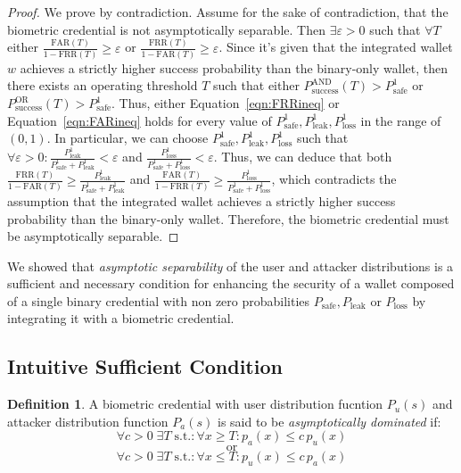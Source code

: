 \documentclass[sigconf]{acmart}
\theoremstyle{definition}
\newtheorem{definition}{Definition}
\begin{document}
\begin{proof}
    We prove by contradiction. Assume for the sake of contradiction, that the biometric credential is not asymptotically separable. Then $\exists \varepsilon > 0$ such that $\forall T$ either $\frac{\mathrm{FAR}(T)}{1-\mathrm{FRR}(T)} \ge \varepsilon$ or $\frac{\mathrm{FRR}(T)}{1-\mathrm{FAR}(T)} \ge \varepsilon$. Since it's given that the integrated wallet $w$ achieves a strictly higher success probability than the binary-only wallet, then there exists an operating threshold $T$ such that either $P^{\text{AND}}_{\text{success}}(T) > P^1_{\text{safe}}$ or $P^{\text{OR}}_{\text{success}}(T) > P^1_{\text{safe}}$. Thus, either Equation~\ref{eqn:FRRineq} or Equation~\ref{eqn:FARineq} holds for every value of $P^{1}_{\text{safe}}, P^{1}_{\text{leak}}, P^{1}_{\text{loss}}$ in the range of $(0,1)$. In particular, we can choose $P^{1}_{\text{safe}}, P^{1}_{\text{leak}}, P^{1}_{\text{loss}}$ such that $\forall \varepsilon > 0: \frac{P^{1}_{\text{leak}}}{P^{1}_{\text{safe}}+P^{1}_{\text{leak}}} < \varepsilon$ and $\frac{P^{1}_{\text{loss}}}{P^{1}_{\text{safe}}+P^{1}_{\text{loss}}} < \varepsilon$. Thus, we can deduce that both $\frac{\mathrm{FRR}(T)}{1-\mathrm{FAR}(T)} \ge \frac{P^{1}_{\text{leak}}}{P^{1}_{\text{safe}}+P^{1}_{\text{leak}}}$ and $\frac{\mathrm{FAR}(T)}{1-\mathrm{FRR}(T)} \ge \frac{P^{1}_{\text{loss}}}{P^{1}_{\text{safe}}+P^{1}_{\text{loss}}}$, which contradicts the assumption that the integrated wallet achieves a strictly higher success probability than the binary-only wallet. Therefore, the biometric credential must be asymptotically separable.

\end{proof}
We showed that \emph{asymptotic separability} of the user and attacker distributions is a sufficient and necessary condition for enhancing the security of a wallet composed of a single binary credential with non zero probabilities $P_\text{safe}, P_\text{leak} \text{ or } P_\text{loss}$ by integrating it with a biometric credential.

\subsection{Intuitive Sufficient Condition}\label{sec:6.3}

\begin{definition}
\label{def:User and Attacker distribution functions}
A biometric credential with user distribution fucntion $P_u(s)$ and attacker distribution function $P_a(s)$
is said to be \emph{asymptotically dominated } if:
\[
\forall c>0\;\exists T\; \text{s.t.}:\forall x \ge T:
p_a(x)\le c\,p_u(x)
\]
\[\quad\text{or}\quad\] 
\[
\forall c>0\;\exists T\; \text{s.t.}:\forall x \le T:
p_u(x)\le c\,p_a(x)
\]
\end{definition}
\end{document}
